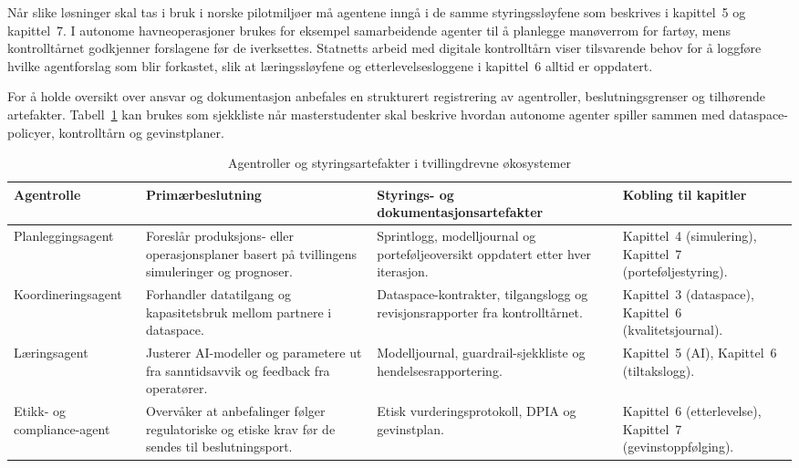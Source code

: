 Når slike løsninger skal tas i bruk i norske pilotmiljøer må agentene inngå i de samme styringssløyfene som beskrives i kapittel~5 og kapittel~7. I autonome havneoperasjoner brukes for eksempel samarbeidende agenter til å planlegge manøverrom for fartøy, mens kontrolltårnet godkjenner forslagene før de iverksettes.\citep{massterly2023operations} Statnetts arbeid med digitale kontrolltårn viser tilsvarende behov for å loggføre hvilke agentforslag som blir forkastet, slik at læringssløyfene og etterlevelsesloggene i kapittel~6 alltid er oppdatert.\citep{statnett2024kontrolltarn}

For å holde oversikt over ansvar og dokumentasjon anbefales en strukturert registrering av agentroller, beslutningsgrenser og tilhørende artefakter. Tabell~\ref{tab:kap09-agentkollektiv} kan brukes som sjekkliste når masterstudenter skal beskrive hvordan autonome agenter spiller sammen med dataspace-policyer, kontrolltårn og gevinstplaner.

\begin{table}[h]
    \centering
    \caption{Agentroller og styringsartefakter i tvillingdrevne økosystemer}
    \label{tab:kap09-agentkollektiv}
    \begin{tabular}{p{3.2cm}p{4.5cm}p{4.2cm}p{3.0cm}}
        \toprule
        \textbf{Agentrolle} & \textbf{Primærbeslutning} & \textbf{Styrings- og dokumentasjonsartefakter} & \textbf{Kobling til kapitler} \\
        \midrule
        Planleggingsagent & Foreslår produksjons- eller operasjonsplaner basert på tvillingens simuleringer og prognoser. & Sprintlogg, modelljournal og porteføljeoversikt oppdatert etter hver iterasjon. & Kapittel~4 (simulering), Kapittel~7 (porteføljestyring). \\
        Koordineringsagent & Forhandler datatilgang og kapasitetsbruk mellom partnere i dataspace. & Dataspace-kontrakter, tilgangslogg og revisjonsrapporter fra kontrolltårnet. & Kapittel~3 (dataspace), Kapittel~6 (kvalitetsjournal). \\
        Læringsagent & Justerer AI-modeller og parametere ut fra sanntidsavvik og feedback fra operatører. & Modelljournal, guardrail-sjekkliste og hendelsesrapportering. & Kapittel~5 (AI), Kapittel~6 (tiltakslogg). \\
        Etikk- og compliance-agent & Overvåker at anbefalinger følger regulatoriske og etiske krav før de sendes til beslutningsport. & Etisk vurderingsprotokoll, DPIA og gevinstplan. & Kapittel~6 (etterlevelse), Kapittel~7 (gevinstoppfølging). \\
        \bottomrule
    \end{tabular}
\end{table}

